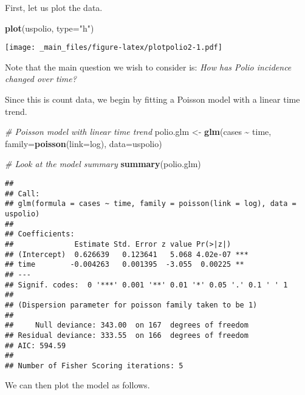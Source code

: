 \documentclass[
  12pt,
]{book}
\newenvironment{Shaded}{\begin{snugshade}}{\end{snugshade}}
\newcommand{\AttributeTok}[1]{\textcolor[rgb]{0.13,0.29,0.53}{#1}}
\newcommand{\CommentTok}[1]{\textcolor[rgb]{0.56,0.35,0.01}{\textit{#1}}}
\newcommand{\DecValTok}[1]{\textcolor[rgb]{0.00,0.00,0.81}{#1}}
\newcommand{\FunctionTok}[1]{\textcolor[rgb]{0.13,0.29,0.53}{\textbf{#1}}}
\newcommand{\NormalTok}[1]{#1}
\newcommand{\OtherTok}[1]{\textcolor[rgb]{0.56,0.35,0.01}{#1}}
\newcommand{\SpecialCharTok}[1]{\textcolor[rgb]{0.81,0.36,0.00}{\textbf{#1}}}
\newcommand{\StringTok}[1]{\textcolor[rgb]{0.31,0.60,0.02}{#1}}
\begin{document}
First, let us plot the data.

\begin{Shaded}
\begin{Highlighting}[]
\FunctionTok{plot}\NormalTok{(uspolio, }\AttributeTok{type=}\StringTok{"h"}\NormalTok{)}
\end{Highlighting}
\end{Shaded}

\texttt{[image: \_main\_files/figure-latex/plotpolio2-1.pdf]}

Note that the main question we wish to consider is: \emph{How has Polio incidence changed over time?}

Since this is count data, we begin by fitting a Poisson model with a linear time trend.

\begin{Shaded}
\begin{Highlighting}[]
\CommentTok{\# Poisson model with linear time trend}
\NormalTok{polio.glm }\OtherTok{\textless{}{-}} \FunctionTok{glm}\NormalTok{(cases }\SpecialCharTok{\textasciitilde{}}\NormalTok{ time, }\AttributeTok{family=}\FunctionTok{poisson}\NormalTok{(}\AttributeTok{link=}\NormalTok{log), }\AttributeTok{data=}\NormalTok{uspolio)}

\CommentTok{\# Look at the model summary}
\FunctionTok{summary}\NormalTok{(polio.glm)}
\end{Highlighting}
\end{Shaded}

\begin{verbatim}
## 
## Call:
## glm(formula = cases ~ time, family = poisson(link = log), data = uspolio)
## 
## Coefficients:
##              Estimate Std. Error z value Pr(>|z|)    
## (Intercept)  0.626639   0.123641   5.068 4.02e-07 ***
## time        -0.004263   0.001395  -3.055  0.00225 ** 
## ---
## Signif. codes:  0 '***' 0.001 '**' 0.01 '*' 0.05 '.' 0.1 ' ' 1
## 
## (Dispersion parameter for poisson family taken to be 1)
## 
##     Null deviance: 343.00  on 167  degrees of freedom
## Residual deviance: 333.55  on 166  degrees of freedom
## AIC: 594.59
## 
## Number of Fisher Scoring iterations: 5
\end{verbatim}

We can then plot the model as follows.

\begin{Shaded}
\end{Shaded}
\end{document}
